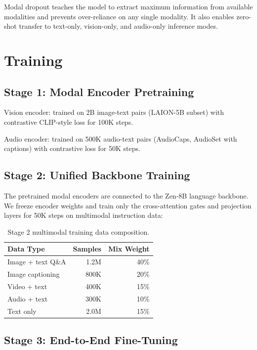 \documentclass[11pt,a4paper]{article}
\begin{document}
Modal dropout teaches the model to extract maximum information from available
modalities and prevents over-reliance on any single modality. It also enables
zero-shot transfer to text-only, vision-only, and audio-only inference modes.

\section{Training}

\subsection{Stage 1: Modal Encoder Pretraining}

Vision encoder: trained on 2B image-text pairs (LAION-5B subset) with contrastive
CLIP-style loss for 100K steps.

Audio encoder: trained on 500K audio-text pairs (AudioCaps, AudioSet with captions)
with contrastive loss for 50K steps.

\subsection{Stage 2: Unified Backbone Training}

The pretrained modal encoders are connected to the Zen-8B language backbone. We
freeze encoder weights and train only the cross-attention gates and projection layers
for 50K steps on multimodal instruction data:

\begin{table}[H]
\centering
\begin{tabular}{lrr}
\toprule
\textbf{Data Type} & \textbf{Samples} & \textbf{Mix Weight} \\
\midrule
Image + text Q\&A & 1.2M & 40\% \\
Image captioning & 800K & 20\% \\
Video + text & 400K & 15\% \\
Audio + text & 300K & 10\% \\
Text only & 2.0M & 15\% \\
\bottomrule
\end{tabular}
\caption{Stage 2 multimodal training data composition.}
\end{table}

\subsection{Stage 3: End-to-End Fine-Tuning}
\end{document}
